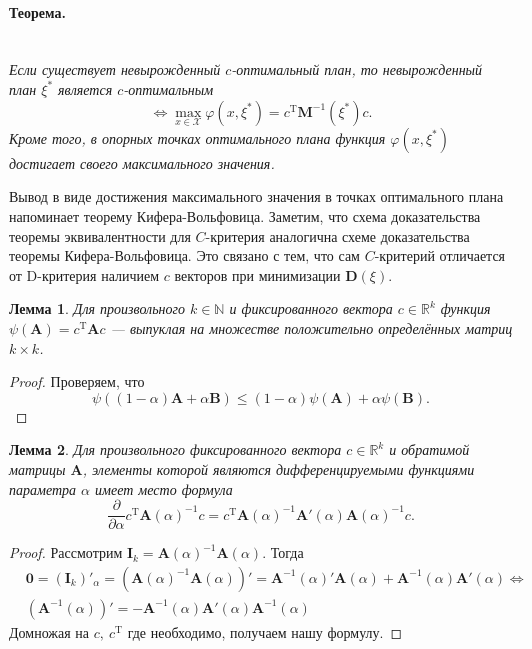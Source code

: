 \documentclass[12pt, a4paper]{article}
\newenvironment{theorem}{\paragraph{Теорема.}\hfill\\\itshape}{\par}
\newtheorem{lemma}{Лемма}
\newcommand{\R}{\mathbb{R}}
\begin{document}
	\begin{theorem}
		Если существует невырожденный $c$-оптимальный план, то невырожденный план $\xi^*$ является $c$-оптимальным
		\begin{equation*}
			\Leftrightarrow \max_{x\in\mathcal{X}}\varphi(x,\xi^*)=c^\mathrm{T}\mathbf{M}^{-1}(\xi^*)c.
		\end{equation*}
		Кроме того, в опорных точках оптимального плана функция $\varphi(x,\xi^*)$ достигает своего максимального значения.
	\end{theorem}
	Вывод в виде достижения максимального значения в точках оптимального плана напоминает теорему Кифера-Вольфовица. Заметим, что схема доказательства теоремы эквивалентности для $C$-критерия аналогична схеме доказательства теоремы Кифера-Вольфовица. Это связано с тем, что сам $C$-критерий отличается от D-критерия наличием $c$ векторов при минимизации $\mathbf{D}(\xi)$.
	\begin{lemma}
		Для произвольного $k\in\mathbb{N}$ и фиксированного вектора $c\in\R^k$ функция $\psi(\mathbf{A})=c^\mathrm{T}\mathbf{A}c$ --- выпуклая на множестве положительно определённых матриц $k\times k$.	
	\end{lemma}
	\begin{proof}
		Проверяем, что
		\begin{equation*}
			\psi((1-\alpha)\mathbf{A}+\alpha\mathbf{B})\leqslant (1-\alpha)\psi(\mathbf{A})+\alpha\psi(\mathbf{B}).
		\end{equation*}
	\end{proof}
	\begin{lemma}
		Для произвольного фиксированного вектора $c\in\R^k$ и обратимой матрицы $\mathbf{A}$, элементы которой являются дифференцируемыми функциями параметра $\alpha$ имеет место формула
		\begin{equation*}
			\dfrac{\partial}{\partial\alpha}c^\mathrm{T}\mathbf{A}(\alpha)^{-1}c=c^\mathrm{T}\mathbf{A}(\alpha)^{-1}\mathbf{A}'(\alpha)\mathbf{A}(\alpha)^{-1}c.
		\end{equation*} 
	\end{lemma}
	\begin{proof}
		Рассмотрим $\mathbf{I}_k=\mathbf{A}(\alpha)^{-1}\mathbf{A}(\alpha).$ Тогда
		\begin{align*}
			&\mathbf{0}=(\mathbf{I}_k)'_\alpha=(\mathbf{A}(\alpha)^{-1}\mathbf{A}(\alpha))'=\mathbf{A}^{-1}(\alpha)'\mathbf{A}(\alpha)+\mathbf{A}^{-1}(\alpha)\mathbf{A}'(\alpha) \Leftrightarrow\\
			&(\mathbf{A}^{-1}(\alpha))'=-\mathbf{A}^{-1}(\alpha)\mathbf{A}'(\alpha)\mathbf{A}^{-1}(\alpha)
		\end{align*}
		Домножая на $c,~c^\mathrm{T}$ где необходимо, получаем нашу формулу. 
	\end{proof}
\end{document}
